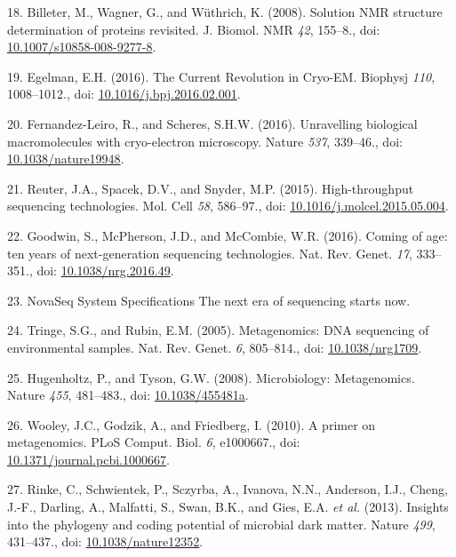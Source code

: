 \documentclass[11pt,a4paper,twoside]{book}
\theoremstyle{definition}
\theoremstyle{definition}
\theoremstyle{remark}
\begin{document}
\hypertarget{ref-Billeter2008}{}
18. Billeter, M., Wagner, G., and Wüthrich, K. (2008). Solution NMR
structure determination of proteins revisited. J. Biomol. NMR \emph{42},
155--8., doi:
\href{https://doi.org/10.1007/s10858-008-9277-8}{10.1007/s10858-008-9277-8}.

\hypertarget{ref-Egelman2016}{}
19. Egelman, E.H. (2016). The Current Revolution in Cryo-EM. Biophysj
\emph{110}, 1008--1012., doi:
\href{https://doi.org/10.1016/j.bpj.2016.02.001}{10.1016/j.bpj.2016.02.001}.

\hypertarget{ref-Fernandez-Leiro2016}{}
20. Fernandez-Leiro, R., and Scheres, S.H.W. (2016). Unravelling
biological macromolecules with cryo-electron microscopy. Nature
\emph{537}, 339--46., doi:
\href{https://doi.org/10.1038/nature19948}{10.1038/nature19948}.

\hypertarget{ref-Reuter2015}{}
21. Reuter, J.A., Spacek, D.V., and Snyder, M.P. (2015). High-throughput
sequencing technologies. Mol. Cell \emph{58}, 586--97., doi:
\href{https://doi.org/10.1016/j.molcel.2015.05.004}{10.1016/j.molcel.2015.05.004}.

\hypertarget{ref-Goodwin2016}{}
22. Goodwin, S., McPherson, J.D., and McCombie, W.R. (2016). Coming of
age: ten years of next-generation sequencing technologies. Nat. Rev.
Genet. \emph{17}, 333--351., doi:
\href{https://doi.org/10.1038/nrg.2016.49}{10.1038/nrg.2016.49}.

\hypertarget{ref-NovaSeqSystemSpecifications}{}
23. NovaSeq System Specifications \textbar{} The next era of sequencing
starts now.

\hypertarget{ref-Tringe2005}{}
24. Tringe, S.G., and Rubin, E.M. (2005). Metagenomics: DNA sequencing
of environmental samples. Nat. Rev. Genet. \emph{6}, 805--814., doi:
\href{https://doi.org/10.1038/nrg1709}{10.1038/nrg1709}.

\hypertarget{ref-Hugenholtz2008}{}
25. Hugenholtz, P., and Tyson, G.W. (2008). Microbiology: Metagenomics.
Nature \emph{455}, 481--483., doi:
\href{https://doi.org/10.1038/455481a}{10.1038/455481a}.

\hypertarget{ref-Wooley2010}{}
26. Wooley, J.C., Godzik, A., and Friedberg, I. (2010). A primer on
metagenomics. PLoS Comput. Biol. \emph{6}, e1000667., doi:
\href{https://doi.org/10.1371/journal.pcbi.1000667}{10.1371/journal.pcbi.1000667}.

\hypertarget{ref-Rinke2013}{}
27. Rinke, C., Schwientek, P., Sczyrba, A., Ivanova, N.N., Anderson,
I.J., Cheng, J.-F., Darling, A., Malfatti, S., Swan, B.K., and Gies,
E.A. \emph{et al.} (2013). Insights into the phylogeny and coding
potential of microbial dark matter. Nature \emph{499}, 431--437., doi:
\href{https://doi.org/10.1038/nature12352}{10.1038/nature12352}.
\end{document}
